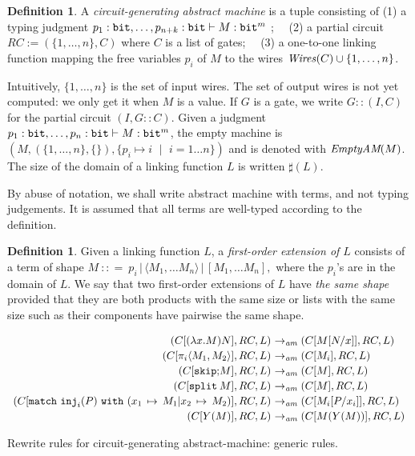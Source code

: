 \documentclass{article}
\theoremstyle{plain}
\theoremstyle{definition}
\newtheorem{definition}[theorem]{Definition}
\newcommand{\bit}{{\tt bit}}
\newcommand{\wires}[1]{{\it Wires}({#1})}
\newcommand{\define}[1]{{\em #1}}
\newcommand{\bor}{\,{|}\,}
\newcommand{\punit}{\mathtt{skip}}\newcommand{\prodterm}[1]{{\langle{#1}\rangle}}
\newcommand{\letunitterm}[2]{{#1}\mathtt{;}{#2}}
\newcommand{\inj}{{\tt inj}}
\newcommand{\match}[5]{{{\mathtt{match}}~{#1}~{\mathtt{with}}~({#2\,\mapsto\,#3}\vert{#4\,\mapsto\,#5})}}
\newcommand{\splitlist}[1][]{{\mathtt{split}^{#1}}}
\newcommand{\emptyam}{\textrm{{\it EmptyAM}}}
\newcommand{\rwam}{\mathrel{\to_{\it am}}}
\begin{document}
\begin{definition}\rm
  A \define{circuit-generating abstract machine} is a tuple consisting
  of (1) a typing judgment $p_1:\bit,\ldots,p_{n+k}:\bit\vdash
    M:\bit^m$ ;~~
  (2) a partial circuit $RC :=
    (\{1,\ldots,n\},C) $ where $C$ is a
    list of gates;~~
  (3) a one-to-one linking function mapping the free variables $p_i$
    of $M$ to the wires $\wires{C}\cup\{1,\ldots,n\}$.

  Intuitively, $\{1,\ldots,n\}$ is the set of input wires. The set of
  output wires is not yet computed: we only get it when $M$ is a
  value.  If $G$ is a gate, we write $G::(I,C)$ for the partial
  circuit $(I,G::C)$.
  Given a judgment
  $p_1:\bit,\ldots,p_n:\bit\vdash M:\bit^m$, the empty machine is $
  (M,(\{1,\ldots,n\},\{\}),\{p_i \mapsto i~~\bor~~ i = 1\ldots
  n\}) $ and is denoted with $\emptyam(M)$. The size of the domain of
  a linking function $L$ is written $\sharp(L)$.

  By abuse of notation, we shall write abstract machine with terms,
  and not typing judgements. It is assumed that all terms are
  well-typed according to the definition.
\end{definition}


\begin{definition}\rm
  Given a linking function $L$, a \define{first-order extension of
    $L$} consists of a term of shape
  $
  M~{:}{:}{=}~p_i\bor\prodterm{M_{1},\ldots M_{n}}\bor
  [M_{1},\ldots M_{n}],
  $
  where the $p_i$'s are in the domain of $L$. We say that two
  first-order extensions of $L$ have \define{the same shape} provided
  that they are both products with the same size or lists with the
  same size such as their components have pairwise the same shape.
\end{definition}




\begin{table}[tb]
  \[\begin{array}{r@{~}l}
        (C[(\lambda x.M)N], RC, L) &\rwam (C[M{[}N/x{]}], RC, L)
        \\[.5ex]
        (C[\pi_i\prodterm{M_1,M_2}], RC, L) &\rwam (C[M_i], RC, L)
        \\[.5ex]
        (C[\letunitterm{\punit}{M}], RC, L)  &\rwam (C[M], RC, L)
        \\[.5ex]
        (C[\splitlist\,M], RC, L) &\rwam (C[M], RC, L)
        \\[.5ex]
        (C[\match{\inj_i(P)}{x_1}{M_1}{x_2}{M_2}], RC, L)
        &\rwam
        (C[M_i{[}P/x_i{]}], RC, L)
        \\[.5ex]
        (C[Y(M)], RC, L)
        &\rwam
        (C[M(Y(M))], RC, L)
    \end{array}
    \]
  \caption{Rewrite rules for circuit-generating abstract-machine:
    generic rules.}
  \label{tab:ambetagen}
\end{table}
\end{document}
